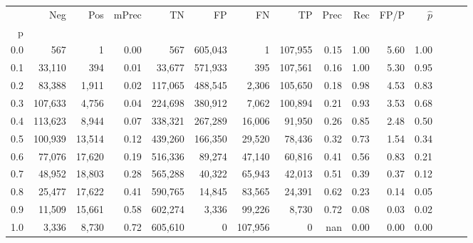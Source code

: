 \begin{tabular}{rrrrrrrrrrrrrrr}
\toprule
{} &      Neg &     Pos & mPrec &       TN &       FP &       FN &       TP &  Prec &   Rec &  FP/P & $\hat{p}$ \\
p   &          &         &       &          &          &          &          &       &       &       &           \\
\midrule
0.0 &      567 &       1 &  0.00 &      567 &  605,043 &        1 &  107,955 &  0.15 &  1.00 &  5.60 &      1.00 \\
0.1 &   33,110 &     394 &  0.01 &   33,677 &  571,933 &      395 &  107,561 &  0.16 &  1.00 &  5.30 &      0.95 \\
0.2 &   83,388 &   1,911 &  0.02 &  117,065 &  488,545 &    2,306 &  105,650 &  0.18 &  0.98 &  4.53 &      0.83 \\
0.3 &  107,633 &   4,756 &  0.04 &  224,698 &  380,912 &    7,062 &  100,894 &  0.21 &  0.93 &  3.53 &      0.68 \\
0.4 &  113,623 &   8,944 &  0.07 &  338,321 &  267,289 &   16,006 &   91,950 &  0.26 &  0.85 &  2.48 &      0.50 \\
0.5 &  100,939 &  13,514 &  0.12 &  439,260 &  166,350 &   29,520 &   78,436 &  0.32 &  0.73 &  1.54 &      0.34 \\
0.6 &   77,076 &  17,620 &  0.19 &  516,336 &   89,274 &   47,140 &   60,816 &  0.41 &  0.56 &  0.83 &      0.21 \\
0.7 &   48,952 &  18,803 &  0.28 &  565,288 &   40,322 &   65,943 &   42,013 &  0.51 &  0.39 &  0.37 &      0.12 \\
0.8 &   25,477 &  17,622 &  0.41 &  590,765 &   14,845 &   83,565 &   24,391 &  0.62 &  0.23 &  0.14 &      0.05 \\
0.9 &   11,509 &  15,661 &  0.58 &  602,274 &    3,336 &   99,226 &    8,730 &  0.72 &  0.08 &  0.03 &      0.02 \\
1.0 &    3,336 &   8,730 &  0.72 &  605,610 &        0 &  107,956 &        0 &   nan &  0.00 &  0.00 &      0.00 \\
\bottomrule
\end{tabular}
